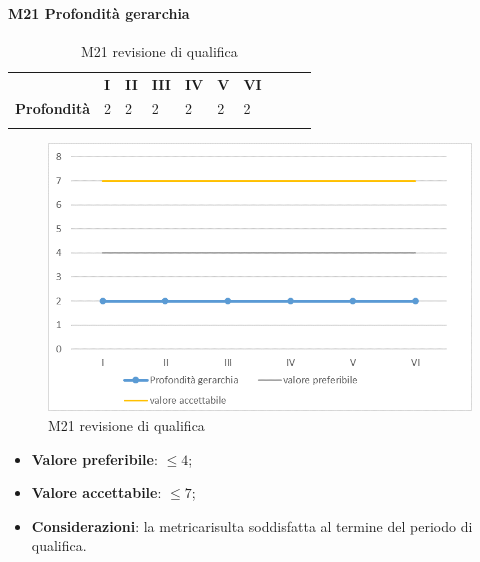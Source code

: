 \paragraph{M21 Profondità gerarchia} \mbox{}
\begin{longtable}[H!] {						
		>{}p{50mm}  		
		>{}p{8mm}
		>{}p{8mm}		
		>{}p{8mm}		
		>{}p{8mm}		
		>{}p{8mm}		
		>{}p{8mm}
		>{}p{8mm}
		>{}p{8mm}
		>{}p{8mm}
	}
	\rowcolor{gray!50}
	\textbf{} & \textbf{I} & \textbf{II} & \textbf{III} & \textbf{IV} & \textbf{V} & \textbf{VI} \TBstrut \\ [2mm]
	\textbf{Profondità} & 2 & 2 & 2 & 2 & 2 & 2 \TBstrut \\ [2mm]
	\rowcolor{white}
	\caption{M21 revisione di qualifica}
\end{longtable}
\begin{figure}[H] 	
	\includegraphics[width=\linewidth]{./img/grafici/RQ21.png}	
	\caption{M21 revisione di qualifica}	
\end{figure}
\begin{itemize}
	\item \textbf{Valore preferibile}: $\le 4$;
	\item \textbf{Valore accettabile}: $\le 7$;
	\item \textbf{Considerazioni}: la metrica\glosp risulta soddisfatta al termine del periodo di qualifica.
\end{itemize}

